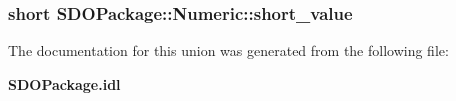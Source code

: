 \subsubsection[{short\_\-value}]{\setlength{\rightskip}{0pt plus 5cm}short {\bf SDOPackage::Numeric::short\_\-value}}\label{unionSDOPackage_1_1Numeric_a37ea8e10da99b8d6147d59bb8bf1588b}


The documentation for this union was generated from the following file:\begin{DoxyCompactItemize}
\item 
{\bf SDOPackage.idl}\end{DoxyCompactItemize}
